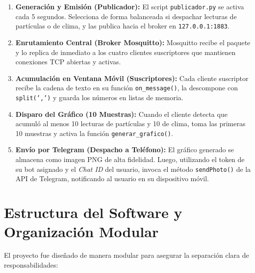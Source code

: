 \documentclass[12pt,letterpaper]{article}
\begin{document}
\begin{enumerate}
    \item \textbf{Generación y Emisión (Publicador):} El script \texttt{publicador.py} se activa cada 5 segundos. Selecciona de forma balanceada si despachar lecturas de partículas o de clima, y las publica hacia el broker en \texttt{127.0.0.1:1883}.
    \item \textbf{Enrutamiento Central (Broker Mosquitto):} Mosquitto recibe el paquete y lo replica de inmediato a los cuatro clientes suscriptores que mantienen conexiones TCP abiertas y activas.
    \item \textbf{Acumulación en Ventana Móvil (Suscriptores):} Cada cliente suscriptor recibe la cadena de texto en su función \texttt{on\_message()}, la descompone con \texttt{split(',')} y guarda los números en listas de memoria.
    \item \textbf{Disparo del Gráfico (10 Muestras):} Cuando el cliente detecta que acumuló al menos 10 lecturas de partículas y 10 de clima, toma las primeras 10 muestras y activa la función \texttt{generar\_grafico()}.
    \item \textbf{Envío por Telegram (Despacho a Teléfono):} El gráfico generado se almacena como imagen PNG de alta fidelidad. Luego, utilizando el token de su bot asignado y el \textit{Chat ID} del usuario, invoca el método \texttt{sendPhoto()} de la API de Telegram, notificando al usuario en su dispositivo móvil.
\end{enumerate}

\section{Estructura del Software y Organización Modular}

El proyecto fue diseñado de manera modular para asegurar la separación clara de responsabilidades:
\end{document}
